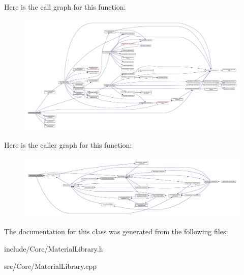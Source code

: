 Here is the call graph for this function\-:
\nopagebreak
\begin{figure}[H]
\begin{center}
\leavevmode
\includegraphics[width=350pt]{class_material_library_a2e77c2e90d100dec3a113c2ea1e94fb5_cgraph}
\end{center}
\end{figure}




Here is the caller graph for this function\-:
\nopagebreak
\begin{figure}[H]
\begin{center}
\leavevmode
\includegraphics[width=350pt]{class_material_library_a2e77c2e90d100dec3a113c2ea1e94fb5_icgraph}
\end{center}
\end{figure}




The documentation for this class was generated from the following files\-:\begin{DoxyCompactItemize}
\item 
include/\-Core/Material\-Library.\-h\item 
src/\-Core/Material\-Library.\-cpp\end{DoxyCompactItemize}
